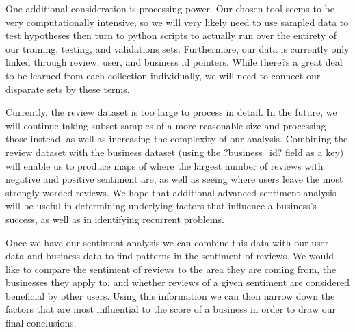 \quad One additional consideration is processing power. Our chosen tool seems to be very computationally intensive, so we will very likely need to use sampled data to test hypotheses then turn to python scripts to actually run over the entirety of our training, testing, and validations sets. Furthermore, our data is currently only linked through review, user, and business id pointers. While there?s a great deal to be learned from each collection individually, we will need to connect our disparate sets by these terms. 

\quad Currently, the review dataset is too large to process in detail. In the future, we will continue taking subset samples of a more reasonable size and processing those instead, as well as increasing the complexity of our analysis. Combining the review dataset with the business dataset (using the ?business\_id? field as a key) will enable us to produce maps of where the largest number of reviews with negative and positive sentiment are, as well as seeing where users leave the most strongly-worded reviews. We hope that additional advanced sentiment analysis will be useful in determining underlying factors that influence a business's success, as well as in identifying recurrent problems.

\quad Once we have our sentiment analysis we can combine this data with our user data and business data to find patterns in the sentiment of reviews. We would like to compare the sentiment of reviews to the area they are coming from, the businesses they apply to, and whether reviews of a given sentiment are considered beneficial by other users. Using this information we can then narrow down the factors that are most influential to the score of a business in order to draw our final conclusions.



